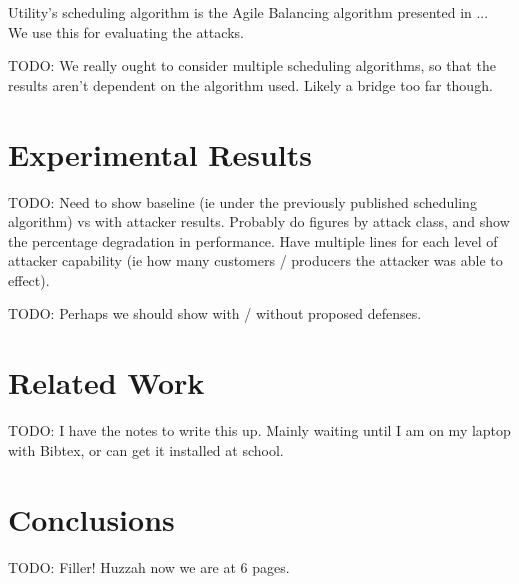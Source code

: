 \documentclass[conference]{IEEEtran}
\begin{document}
Utility's scheduling algorithm is the Agile Balancing algorithm presented in ... We use this for evaluating the attacks.

TODO:  We really ought to consider multiple scheduling algorithms, so that the results aren't dependent on the algorithm 
used.  Likely a bridge too far though.

\section{Experimental Results}

TODO: Need to show baseline (ie under the previously published scheduling algorithm) vs with attacker results.  Probably
do figures by attack class, and show the percentage degradation in performance.  Have multiple lines for each level of attacker
capability (ie how many customers / producers the attacker was able to effect).

TODO: Perhaps we should show with / without proposed defenses.

\section{Related Work}

TODO: I have the notes to write this up.  Mainly waiting until I am on my laptop with Bibtex, or can get it installed at school.

\section{Conclusions}

TODO:  Filler!  Huzzah now we are at 6 pages.
\end{document}
